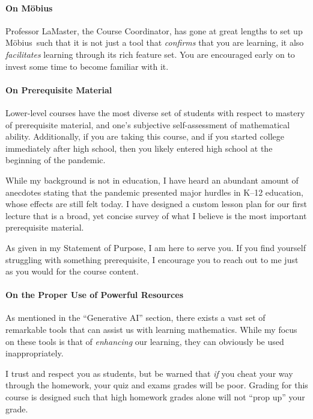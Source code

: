 \documentclass[letterpaper,twoside]{article}
\def\Mobius{M\"obius\ }
\begin{document}
\begin{multicols*}{2}
    \paragraph*{On \Mobius}
    Professor LaMaster, the Course Coordinator, has gone at great lengths to set up \Mobius such that it is not just a tool that \textit{confirms} that you are learning, it also \textit{facilitates} learning through its rich feature set.
    You are encouraged early on to invest some time to become familiar with it.

    \paragraph*{On Prerequisite Material}
    Lower-level courses have the most diverse set of students with respect to mastery of prerequisite material, and one's subjective self-assessment of mathematical ability.
    Additionally, if you are taking this course, and if you started college immediately after high school, then you likely entered high school at the beginning of the pandemic.
    
    While my background is not in education, I have heard an abundant amount of anecdotes stating that the pandemic presented major hurdles in K--12 education, whose effects are still felt today.
    I have designed a custom lesson plan for our first lecture that is a broad, yet concise survey of what I believe is the most important prerequisite material.

    As given in my Statement of Purpose, I am here to serve you.
    If you find yourself struggling with something prerequisite, I encourage you to reach out to me just as you would for the course content.

    \paragraph{On the Proper Use of Powerful Resources}
    As mentioned in the ``Generative AI'' section, there exists a vast set of remarkable tools that can assist us with learning mathematics.
    While my focus on these tools is that of \textit{enhancing} our learning, they can obviously be used inappropriately.

    I trust and respect you as students, but be warned that \textit{if} you cheat your way through the homework, your quiz and exams grades will be poor.
    Grading for this course is designed such that high homework grades alone will not ``prop up'' your grade.


\end{multicols*}
\end{document}
